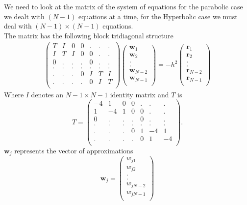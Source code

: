 We need to look at the matrix of the system of equations for the parabolic case we dealt with $(N-1)$ equations at a time, for the Hyperbolic case we must deal
with $(N-1)\times(N-1)$ equations.\\
The matrix has the following block tridiagonal structure
\begin{eqnarray*}
\left(\begin{array}{ccccccc}
T&I&0&0&.&.&.\\
I&T&I&0&0&.&.\\
0&.&.&.&0&.&.\\
.&.&.&.&.&.&.\\
.&.&.&0&I&T&I\\
.&.&.&.&0&I&T\\
\end{array}\right)
\left(\begin{array}{c}
\mathbf{w}_1\\
\mathbf{w}_2\\
.\\
.\\
\mathbf{w}_{N-2}\\
\mathbf{w}_{N-1}\\
\end{array}\right)
=-h^2
\left(\begin{array}{c}
\mathbf{r}_1\\
\mathbf{r}_2\\
.\\
.\\
\mathbf{r}_{N-2}\\
\mathbf{r}_{N-1}\\
\end{array}\right)
\end{eqnarray*}
Where $I$ denotes an $N-1 \times N-1$ identity matrix and $T$ is
\[ T=\left(\begin{array}{ccccccc}
-4&1&0&0&.&.&.\\
1&-4&1&0&0&.&.\\
0&.&.&.&0&.&.\\
.&.&.&.&.&.&.\\
.&.&.&0&1&-4&1\\
.&.&.&.&0&1&-4\\
\end{array}\right).
\]
$\mathbf{w}_j$ represents the vector of approximations
\[\mathbf{w}_j=\left(\begin{array}{c}
w_{j1}\\
w_{j2}\\
.\\
.\\
w_{jN-2}\\
w_{jN-1}\\
\end{array}\right)
\]
